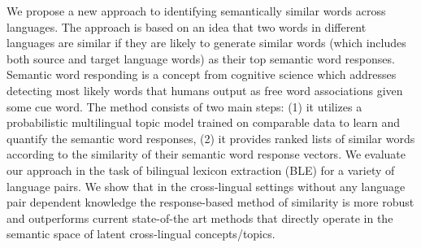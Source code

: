 We propose a new approach to identifying semantically similar words across languages. The approach is based on an idea that two words in different
 languages are similar if they are likely to generate similar words (which
 includes both source and target language words) as their top semantic word
 responses. Semantic word responding is a concept from cognitive science which
 addresses detecting most likely words that humans output as free word
 associations given some cue word. The method consists of two main steps: (1) it
 utilizes a probabilistic multilingual topic model trained on comparable data to
 learn and quantify the semantic word responses, (2) it provides ranked lists of
 similar words according to the similarity of their semantic word response
 vectors. We evaluate our approach in the task of bilingual lexicon extraction
 (BLE) for a variety of language pairs. We show that in the cross-lingual
 settings without any language pair dependent knowledge the response-based
 method of similarity is more robust and outperforms current state-of-the art
 methods that directly operate in the semantic space of latent cross-lingual
 concepts/topics.

